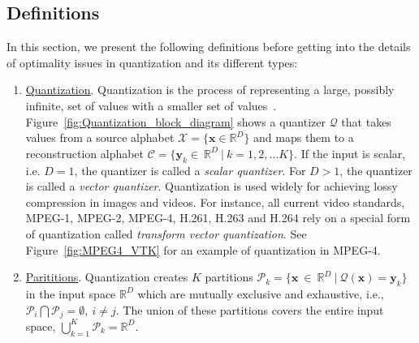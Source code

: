 \begin{Body}
\section{Definitions}
\label{sec:definitions}
In this section, we present the following definitions before getting into the details of optimality issues in quantization and its different types:

\begin{enumerate}
\item \underline{Quantization}.  Quantization is the process of representing a large, possibly infinite, set of values with a smaller set of values~\cite{2005_BOOK_DataCompression_Sayood}.  Figure~\ref{fig:Quantization_block_diagram} shows a quantizer $\mathcal{Q}$ that takes values from a source alphabet $\mathcal{X}=\{\mathbf{x} \in \mathbb{R}^D\}$ and maps them to a reconstruction alphabet $\mathcal{C}=\{\mathbf{y}_k \in \ \mathbb{R}^D \ | \ k=1,2, \ldots K\}$.  If the input is scalar, i.e. $D=1$, the quantizer is called a \emph{scalar quantizer}.  For $D>1$, the quantizer is called a \emph{vector quantizer}.  Quantization is used widely for achieving lossy compression in images and videos.  For instance, all current video standards, MPEG-1, MPEG-2, MPEG-4, H.261, H.263 and H.264 rely on a special form of quantization called \emph{transform vector quantization}.  See Figure~\ref{fig:MPEG4_VTK} for an example of quantization in MPEG-4.

\item \underline{Parititions}.  Quantization creates $K$ partitions $\mathcal{P}_k = \{\mathbf{x} \ \in \ \mathbb{R}^D \ | \ \mathcal{Q}(\mathbf{x}) = \mathbf{y}_k\}$ in the input space $\mathbb{R}^D$ which are mutually exclusive and exhaustive, i.e., $\mathcal{P}_i \bigcap \mathcal{P}_j = \emptyset, \ i \neq j$.  The union of these partitions covers the entire input space, $\bigcup\limits_{k=1}^{K} \mathcal{P}_k=\mathbb{R}^D$.


\end{enumerate}
\end{Body}

